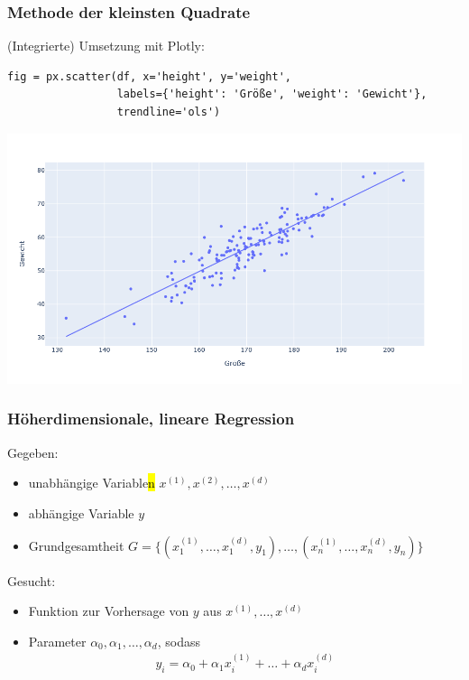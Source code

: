 
\begin{frame}[fragile]
\frametitle{Methode der kleinsten Quadrate}

(Integrierte) Umsetzung mit Plotly:
\begin{verbatim}
fig = px.scatter(df, x='height', y='weight',
                 labels={'height': 'Größe', 'weight': 'Gewicht'},
                 trendline='ols')
\end{verbatim}

\begin{center}
\includegraphics[width=0.6\linewidth]{fig8/artifical-ols.png}
\end{center}

\end{frame}


\begin{frame}
\frametitle{Höherdimensionale, lineare Regression}

Gegeben:
\begin{itemize}
	\item unabhängige Variable\hl{n} $x^{(1)}, x^{(2)}, \dots, x^{(d)}$
	\item abhängige Variable $y$
	\item Grundgesamtheit $G = \{(x^{(1)}_1, \dots, x^{(d)}_1, y_1), \dots, (x^{(1)}_n, \dots, x^{(d)}_n, y_n)\}$
\end{itemize}

Gesucht:
\begin{itemize}
	\item Funktion zur Vorhersage von $y$ aus $x^{(1)}, \dots, x^{(d)}$
	\item Parameter $\alpha_0, \alpha_1, \dots, \alpha_d$, sodass \begin{align*}
		y_i = \alpha_0 + \alpha_1 x^{(1)}_i + \dots + \alpha_d x^(d)_i
	\end{align*}
\end{itemize}

\end{frame}

